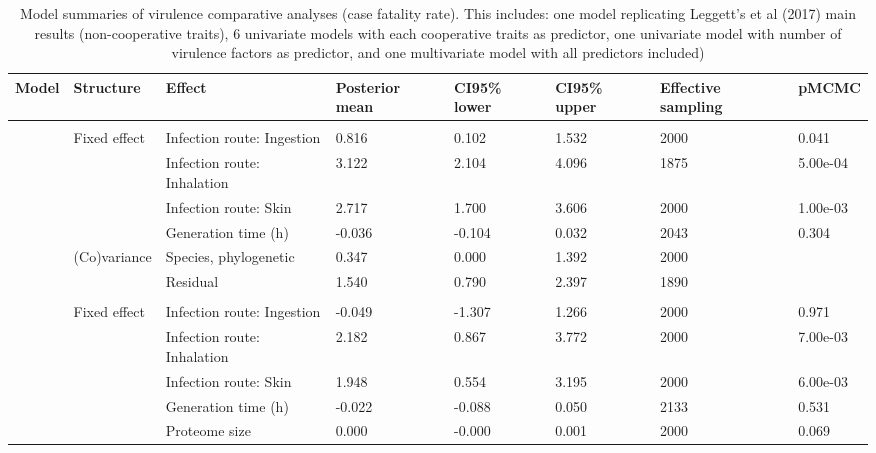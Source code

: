 \begin{table}

\caption{\label{tab:}Model summaries of virulence comparative analyses (case fatality rate). This includes: one model replicating Leggett's et al (2017) main results (non-cooperative traits), 6 univariate models with each cooperative traits as predictor, one univariate model with number of virulence factors as predictor, and one multivariate model with all predictors included)}
\centering
\begin{tabular}[t]{llllllll}
\toprule
Model & Structure & Effect & Posterior
 mean & CI95\% lower & CI95\% upper & Effective
 sampling & pMCMC\\
\midrule
\addlinespace[0.3em]
\multicolumn{8}{l}{\textbf{Non-cooperative traits}}\\
\hspace{1em} & Fixed effect & Infection route: Ingestion & 0.816 & 0.102 & 1.532 & 2000 & 0.041\\
\hspace{1em} &  & Infection route: Inhalation & 3.122 & 2.104 & 4.096 & 1875 & 5.00e-04\\
\hspace{1em} &  & Infection route: Skin & 2.717 & 1.700 & 3.606 & 2000 & 1.00e-03\\
\hspace{1em} &  & Generation time (h) & -0.036 & -0.104 & 0.032 & 2043 & 0.304\\
\hspace{1em} & (Co)variance & Species, phylogenetic & 0.347 & 0.000 & 1.392 & 2000 & \\
\hspace{1em} &  & Residual & 1.540 & 0.790 & 2.397 & 1890 & \\
\addlinespace[0.3em]
\multicolumn{8}{l}{\textbf{Secretome}}\\
\hspace{1em} & Fixed effect & Infection route: Ingestion & -0.049 & -1.307 & 1.266 & 2000 & 0.971\\
\hspace{1em} &  & Infection route: Inhalation & 2.182 & 0.867 & 3.772 & 2000 & 7.00e-03\\
\hspace{1em} &  & Infection route: Skin & 1.948 & 0.554 & 3.195 & 2000 & 6.00e-03\\
\hspace{1em} &  & Generation time (h) & -0.022 & -0.088 & 0.050 & 2133 & 0.531\\
\hspace{1em} &  & Proteome size & 0.000 & -0.000 & 0.001 & 2000 & 0.069\\

\end{tabular}
\end{table}
